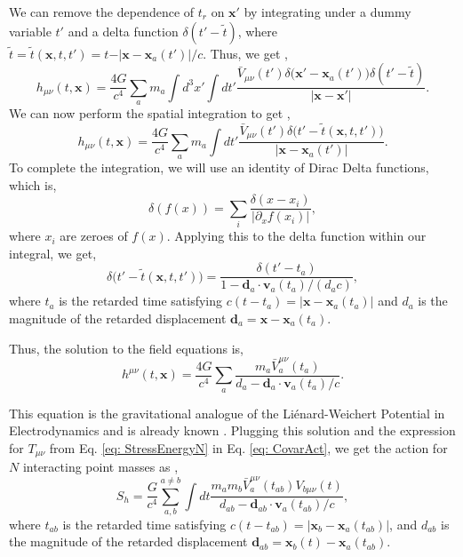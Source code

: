\documentclass[12pt,a4paper]{report}
\theoremstyle{plain}
\theoremstyle{definition}
\theoremstyle{remark}
\newcommand{\munu}{\mu\nu}
\begin{document}
We can remove the dependence of $t_r$ on $\bm{x'}$ by integrating under a dummy variable $t'$ and a delta function $\delta(t' - \tilde{t})$, where $\tilde t = \tilde{t}(\bm x, t,t') = t - \vert \bm x - \bm x_a(t') \vert/c $. Thus, we get \cite{Christodoulou_2023b},
\begin{equation}
    h_{\mu \nu}(t, \bm x) = \frac{4 G}{c^4} \sum_a m_a \int d^3 x'  \int d t' \frac{ \bar{V}_{\mu \nu} ( t') \delta\big( \bm{x}' - \bm{x}_a(t')\big)  \delta(t'- \tilde{t})}{\vert \bm{x}- \bm{x}'\vert}.
\end{equation}
We can now perform the spatial integration to get \cite{Christodoulou_2023b},
\begin{equation}
    h_{\mu \nu}(t, \bm x) = \frac{4 G}{c^4} \sum_a m_a \int dt' \frac{ \bar{V}_{\mu \nu} (t') \delta\big(t'-\tilde{t}(\bm x, t,t')\big)}{\vert \bm{x}- \bm{x}_a(t')\vert}.
\end{equation}
To complete the integration, we will use an identity of Dirac Delta functions, which is,
\begin{equation}
    \delta(f(x)) = \sum_i \frac{\delta(x -x_i)}{|\partial_xf(x_i)|},
\end{equation}
where $x_i$ are zeroes of $f(x)$. Applying this to the delta function within our integral, we get,
\begin{equation}
    \delta\big(t'-\tilde{t}(\bm x, t,t')\big) = \frac{\delta(t'-t_a)}{1 - \bm{d}_a \cdot \bm{v}_a(t_a)/(d_a c)},
\end{equation}
where $t_a$ is the retarded time satisfying $c(t-t_a) = |\bm{x}- \bm{x}_a(t_a)|$ and $d_a$ is the magnitude of the retarded displacement $\bm{d}_a = \bm{x}- \bm{x}_a(t_a)$. 

Thus, the solution to the field equations is,
\begin{equation}
    h^{\mu \nu}(t,\bm{x}) =  \frac{4 G }{c^4} \sum_a   \frac{m_a \bar{V}^{\mu \nu}_a(t_a)}{d_a - \bm{d}_a \cdot \bm{v}_a(t_a)/c}.
\end{equation}

This equation is the gravitational analogue of the Li\'{e}nard-Weichert Potential in Electrodynamics \cite{Jackson_1999} and is already known \cite{Christodoulou_2023b, PhysRevD.60.124002}.
Plugging this solution and the expression for $T_{\munu}$ from Eq. \ref{eq: StressEnergyN} in Eq. \ref{eq: CovarAct}, we get the action for $N$ interacting point masses as \cite{Christodoulou_2023b},
\begin{equation} \label{eq: GravActionN}
    S_h = \frac{G}{c^4}\sum_{a,b}^{a \neq b}\int dt \frac{m_a m_b  \bar{V}_a^{\munu}(t_{ab}) V_{b\munu}(t)}{d_{ab}-\bm d_{ab}\cdot\bm v_{a}(t_{ab})/c},
\end{equation}
where $t_{ab}$ is the retarded time satisfying $c(t-t_{ab}) = |\bm{x}_b- \bm{x}_a(t_{ab})|$, and $d_{ab}$ is the magnitude of the retarded displacement $\bm{d}_{ab} = \bm{x}_b(t)- \bm{x}_a(t_{ab})$.
\end{document}
